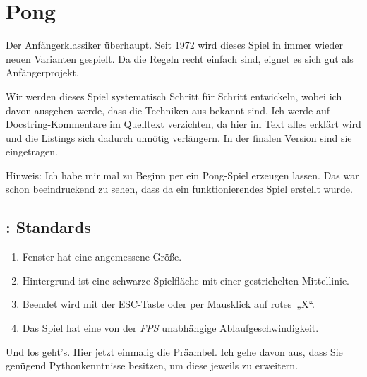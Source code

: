 \section{Pong}

Der Anfängerklassiker überhaupt. Seit 1972 wird dieses Spiel in immer wieder neuen Varianten gespielt. Da die Regeln recht einfach sind, eignet es sich gut als Anfängerprojekt. 

Wir werden dieses Spiel systematisch Schritt für Schritt entwickeln, wobei ich davon ausgehen werde, dass die Techniken aus  bekannt sind. Ich werde auf Docstring-Kommentare im Quelltext verzichten, da hier im Text alles erklärt wird und die Listings sich dadurch unnötig verlängern. In der finalen Version sind sie eingetragen.

Hinweis: Ich habe mir mal zu Beginn per  ein Pong-Spiel erzeugen lassen. Das war schon beeindruckend zu sehen, dass da ein funktionierendes Spiel erstellt wurde.

\subsection{: Standards}

\begin{enumerate}
    \item Fenster hat eine angemessene Größe.\label{req0201StandardGröße}
    \item Hintergrund ist eine schwarze Spielfläche mit einer gestrichelten Mittellinie.\label{req0201StandardHintergrund}
    \item Beendet wird mit der ESC-Taste oder per Mausklick auf rotes~„X“.\label{req0201StandardBeenden}
    \item Das Spiel hat eine von der \emph{FPS} unabhängige Ablaufgeschwindigkeit.\label{req0201StandardFps}
\end{enumerate}
\er

Und los geht's. Hier jetzt einmalig die Präambel. Ich gehe davon aus, dass Sie genügend Pythonkenntnisse besitzen, um diese jeweils zu erweitern.


